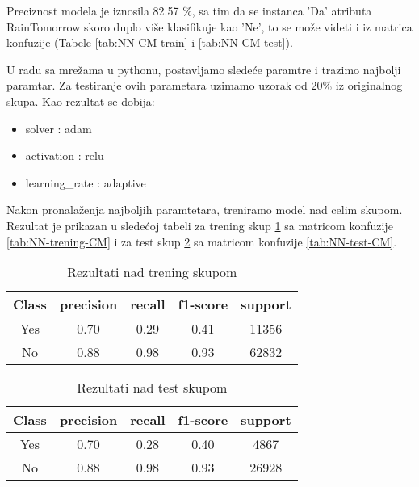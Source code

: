 \documentclass[a4paper]{article}
\begin{document}
Preciznost modela je iznosila 82.57 \%, sa tim da se instanca 'Da' atributa RainTomorrow skoro duplo više klasifikuje kao 'Ne', to se može videti i iz matrica konfuzije (Tabele \ref{tab:NN-CM-train} i \ref{tab:NN-CM-test}). \par

U radu sa mrežama u pythonu, postavljamo sledeće paramtre i trazimo najbolji paramtar. Za testiranje ovih parametara uzimamo uzorak od 20\% iz originalnog skupa. Kao rezultat se dobija:
\begin{itemize}
    \item solver : adam
    \item activation : relu 
    \item learning\_rate : adaptive
\end{itemize}
\label{code:NN}


Nakon pronalaženja najboljih paramtetara, treniramo model nad celim skupom. Rezultat je prikazan u sledećoj tabeli za trening skup \ref{tab:NN-py-train} sa matricom konfuzije \ref{tab:NN-trening-CM} i za test skup \ref{tab:NN-py-test} sa matricom konfuzije \ref{tab:NN-test-CM}.\par


\begin{table}[H]
        \begin{center}
        \caption{Rezultati nad trening skupom}
        \label{tab:NN-py-train}
        \begin{tabular}{|c|c|c|c|c|} \hline
        \textbf{Class} & \textbf{precision} & \textbf{recall}  & \textbf{f1-score} & \textbf{support} \\ \hline
        Yes &  0.70&      0.29    &  0.41   &  11356 \\ \hline
        No & 0.88   &   0.98   &   0.93  &   62832 \\ \hline
        \end{tabular}
        \end{center}
    \end{table}
        
    \begin{table}[H]
        \begin{center}
        \caption{Rezultati nad test skupom}
        \label{tab:NN-py-test}
        \begin{tabular}{|c|c|c|c|c|} \hline
        \textbf{Class} & \textbf{precision} & \textbf{recall}  & \textbf{f1-score} & \textbf{support} \\ \hline
        Yes &  0.70   &   0.28   &   0.40    &  4867 \\ \hline
        No & 0.88   &   0.98   &   0.93   &  26928 \\ \hline
        \end{tabular}
        \end{center}
    \end{table}
    
\end{document}
